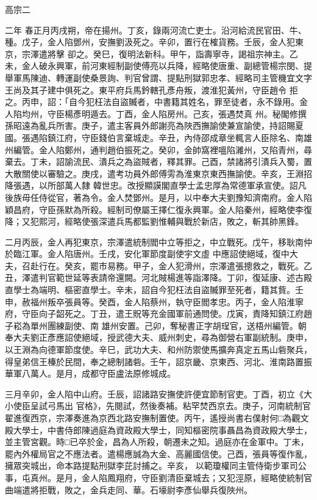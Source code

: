 
\begin{pinyinscope}

 高宗二


二年
 春正月丙戌朔，帝在揚州。丁亥，錄兩河流亡吏士。沿河給流民官田、牛、種。戊子，金人陷鄧州，安撫劉汲死之。辛卯，置行在榷貨務。壬辰，金人犯東京，宗澤遣將擊
 卻之。癸巳，復明法新科。甲午，詣壽寧寺，謁祖宗神主。乙未，金人破永興軍，前河東經制副使傅亮以兵降，經略使唐重、副總管楊宗閔、提舉軍馬陳迪、轉運副使桑景詢、判官曾謂、提點刑獄郭忠孝、經略司主管機宜文字王尚及其子建中俱死之。東平府兵馬鈐轄孔彥舟叛，渡淮犯黃州，守臣趙令
 拒之。丙申，詔：「自今犯枉法自盜贓者，中書籍其姓名，罪至徒者，永不錄用。金人陷均州，守臣楊彥明遁去。丁酉，金人陷房州。己亥，張遇焚真
 州。秘閣修撰孫昭遠為亂兵所害。庚子，遣主客員外郎謝亮為陜西撫諭使兼宣諭使，持詔賜夏國。張遇陷鎮江府，守臣錢伯言棄城走。辛丑，內侍邵成章坐輒言人臣除名、南雄州編管。金人陷鄭州，通判趙伯振死之。癸卯，金帥窩裡嗢陷濰州，又陷青州，尋棄去。丁未，詔諭流民、潰兵之為盜賊者，釋其罪。己酉，禁諸將引潰兵入蜀，置大散關使以審驗之。庚戌，遣考功員外郎傅雱為淮東京東西撫諭使。辛亥，王淵招降張遇，以所部萬人隸
 韓世忠。改授顯謨閣直學士孟忠厚為常德軍承宣使。詔凡後族毋任侍從官，著為令。金人焚鄧州。是月，以中奉大夫劉豫知濟南府。金人陷穎昌府，守臣孫默為所殺。經制司僚屬王擇仁復永興軍。金人陷秦州，經略使李復降；又犯熙河，經略使張深遣兵馬都監劉惟輔與戰於新店，敗之，斬其帥黑鋒。



 二月丙辰，金人再犯東京，宗澤遣統制閻中立等拒之，中立戰死。戊午，移耿南仲於臨江軍。金人陷唐州。壬戌，安化軍節度副使宇文虛
 中應詔使絕域，復中大夫，召赴行在。癸亥，罷市易務。甲子，金人犯滑州，宗澤遣張摠救之，戰死。乙丑，澤遣判官範世延等表請帝還闕。河北賊楊進等詣澤降。丁卯，復延康、述古殿直學士為端明、樞密直學士。辛未，詔自今犯枉法自盜贓罪至死者，籍其貲。壬申，赦福州叛卒張員等。癸酉，金人陷蔡州，執守臣閻孝忠。丙子，金人陷淮寧府，守臣向子韶死之。丁丑，遣王貺等充金國軍前通問使。戊寅，責降知鎮江府趙子崧為單州團練副使、南
 雄州安置。己卯，奪秘書正字胡珵官，送梧州編管。朝奉大夫劉正彥應詔使絕域，授武德大夫、威州刺史，尋為御營右軍副統制。庚申，以王淵為向德軍節度使。辛巳，武功大夫、和州防禦使馬擴奔真定五馬山砦聚兵，得皇弟信王榛於民間，奉之總制諸砦。壬午，詔京畿、京東西、河北、淮南路置振華軍八萬人。是月，成都守臣盧法原修城成。



 三月辛卯，金人陷中山府。壬辰，詔諸路安撫使許便宜節制官吏。丁酉，初立《大小使臣呈試弓馬出
 官格》，先閱試，然後奏補。粘罕焚西京去。庚子，河南統制官翟進復西京，宗澤奏進為京西北路安撫制置使。丙午，遙授尚書右僕射何□為觀文殿大學士，中書侍郎陳過庭為資政殿大學士，同知樞密院事聶昌為資政殿大學士，並主管宮觀。時□已卒於金，昌為人所殺，朝遷未之知。過庭亦在金軍中。丁未，罷內外權局官之不應法者。遣楊應誠為大金、高麗國信使。己酉，張員等復作亂，擁眾突城出，命本路提點刑獄李芘討捕之。辛亥，
 以範瓊權同主管侍衛步軍司公事，屯真州。是月，金人陷鳳翔府，守臣劉清臣棄城去；又犯涇原，經略使統制官曲端遣將拒戰，敗之，金兵走同、華。石壕尉李彥仙舉兵復陜州。




\end{pinyinscope}
